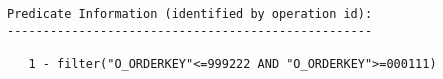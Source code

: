 \documentclass[11pt,a4paper,parskip=half]{scrartcl}
\begin{document}
\begin{lstlisting}
Predicate Information (identified by operation id):                                                                                                                                                                                                                                                          
---------------------------------------------------                                                                                                                                                                                                                                                          
                                                                                                                                                                                                                                                                                                             
   1 - filter("O_ORDERKEY"<=999222 AND "O_ORDERKEY">=000111)                                                                                                                                                                                                                                                 
\end{lstlisting}
\end{document}
